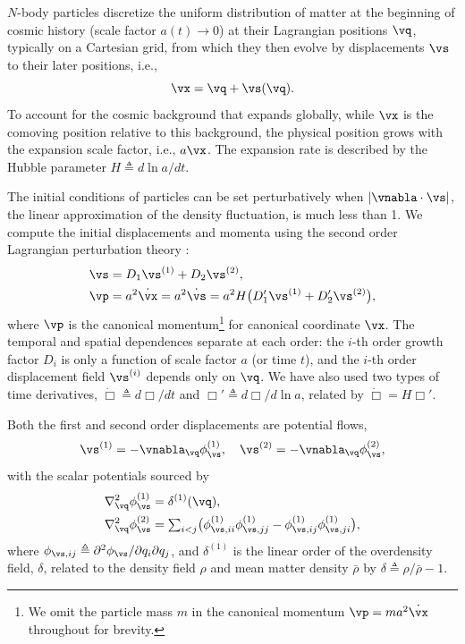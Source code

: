 \documentclass[modern, dvipsnames]{aastex631}
\renewcommand{\d}{d}
\newcommand{\p}{\partial}
\begin{document}
$N$-body particles discretize the uniform distribution of matter at the
beginning of cosmic history (scale factor $a(t) \to 0$) at their
Lagrangian positions $\vq$, typically on a Cartesian grid, from which
they then evolve by displacements $\vs$ to their later positions, i.e.,
%
\begin{equation}
\vx = \vq + \vs(\vq).
\end{equation}
%
To account for the cosmic background that expands globally, while $\vx$
is the comoving position relative to this background, the physical
position grows with the expansion scale factor, i.e., $a \vx$.
The expansion rate is described by the Hubble parameter $H \triangleq \d
\ln a / \d t$.

The initial conditions of particles can be set perturbatively when
$|\vnabla \cdot \vs|$, the linear approximation of the density
fluctuation, is much less than 1.
We compute the initial displacements and momenta using the second order
Lagrangian perturbation theory \citep[2LPT,][]{BouchetEtAl1995}:
%
\begin{align}
\vs &= D_1 \vs^{(1)} + D_2 \vs^{(2)}, \nonumber\\
\vp &= a^2 \dot\vx = a^2 \dot\vs
  = a^2 H \bigl( D_1' \vs^{(1)} + D_2' \vs^{(2)} \bigr),
\label{lpt}
\end{align}
%
where $\vp$ is the canonical momentum\footnote{We omit the particle mass
$m$ in the canonical momentum $\vp = m a^2 \dot\vx$ throughout for
brevity.} for canonical coordinate $\vx$.
The temporal and spatial dependences separate at each order: the $i$-th
order growth factor $D_i$ is only a function of scale factor $a$ (or
time $t$), and the $i$-th order displacement field $\vs^{(i)}$ depends
only on $\vq$.
We have also used two types of time derivatives, $\dot\Box \triangleq
\d\Box / \d t$ and $\Box' \triangleq \d\Box / \d \ln a$, related by
$\dot\Box = H \Box'$.

Both the first and second order displacements are potential flows,
%
\begin{equation}
\vs^{(1)} = - \vnabla_\vq \phi_\vs^{(1)},
\quad
\vs^{(2)} = - \vnabla_\vq \phi_\vs^{(2)},
\end{equation}
%
with the scalar potentials sourced by
%
\begin{align}
\nabla_\vq^2 \phi_\vs^{(1)} &= \delta^{(1)}(\vq), \nonumber\\
%
\nabla_\vq^2 \phi_\vs^{(2)} &= {\textstyle \sum_{i<j}} \bigl(
  \phi_{\vs,ii}^{(1)}\phi_{\vs,jj}^{(1)}
  - \phi_{\vs,ij}^{(1)}\phi_{\vs,ji}^{(1)}
\bigr),
\end{align}
%
where $\phi_{\vs,ij} \triangleq \p^2\phi_\vs / \p q_i \p q_j$,
and $\delta^{(1)}$ is the linear order of the overdensity field,
$\delta$, related to the density field $\rho$ and mean matter density
$\bar\rho$ by $\delta \triangleq \rho / \bar\rho - 1$.
\end{document}

